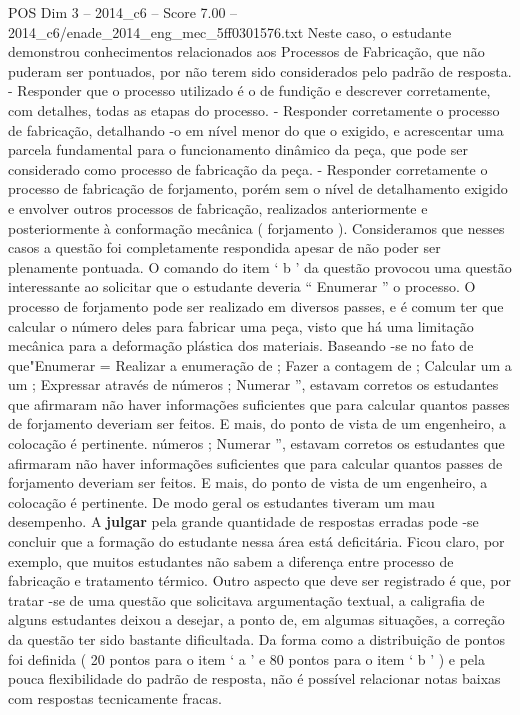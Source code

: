 \begin{textsample}{POS Dim 3 – 2014\_c6 – Score 7.00 – 2014\_c6/enade\_2014\_eng\_mec\_5ff0301576.txt}
Neste caso, o estudante demonstrou conhecimentos relacionados aos Processos de Fabricação, que não puderam ser pontuados, por não terem sido considerados pelo padrão de resposta. - Responder que o processo utilizado é o de fundição e descrever corretamente, com detalhes, todas as etapas do processo. - Responder corretamente o processo de fabricação, detalhando -o em nível menor do que o exigido, e acrescentar uma parcela fundamental para o funcionamento dinâmico da peça, que pode ser considerado como processo de fabricação da peça. - Responder corretamente o processo de fabricação de forjamento, porém sem o nível de detalhamento exigido e envolver outros processos de fabricação, realizados anteriormente e posteriormente à conformação mecânica ( forjamento ).
Consideramos que nesses casos a questão foi completamente respondida apesar de não poder ser plenamente pontuada.
O comando do item ‘ b ’ da questão provocou uma questão interessante ao solicitar que o estudante deveria “ Enumerar ” o processo.
O processo de forjamento pode ser realizado em diversos passes, e é comum ter que calcular o número deles para fabricar uma peça, visto que há uma limitação mecânica para a deformação plástica dos materiais.
Baseando -se no fato de que"Enumerar = Realizar a enumeração de ; Fazer a contagem de ; Calcular um a um ; Expressar através de números ; Numerar ”, estavam corretos os estudantes que afirmaram não haver informações suficientes que para calcular quantos passes de forjamento deveriam ser feitos.
E mais, do ponto de vista de um engenheiro, a colocação é pertinente. números ; Numerar ”, estavam corretos os estudantes que afirmaram não haver informações suficientes que para calcular quantos passes de forjamento deveriam ser feitos.
E mais, do ponto de vista de um engenheiro, a colocação é pertinente.
De modo geral os estudantes tiveram um mau desempenho.
A \textbf{julgar} pela grande quantidade de respostas erradas pode -se concluir que a formação do estudante nessa área está deficitária.
Ficou claro, por exemplo, que muitos estudantes não sabem a diferença entre processo de fabricação e tratamento térmico.
Outro aspecto que deve ser registrado é que, por tratar -se de uma questão que solicitava argumentação textual, a caligrafia de alguns estudantes deixou a desejar, a ponto de, em algumas situações, a correção da questão ter sido bastante dificultada.
Da forma como a distribuição de pontos foi definida ( 20 pontos para o item ‘ a ’ e 80 pontos para o item ‘ b ’ ) e pela pouca flexibilidade do padrão de resposta, não é possível relacionar notas baixas com respostas tecnicamente fracas.

\end{textsample}
